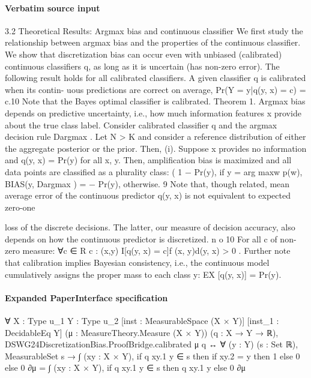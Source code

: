 \documentclass[10pt]{article}
\begin{document}
\paragraph{Verbatim source input}
\begin{ReviewVerbatim}
3.2     Theoretical Results: Argmax bias and continuous classifier
We first study the relationship between argmax bias and the properties of the continuous classifier. We show
that discretization bias can occur even with unbiased (calibrated) continuous classifiers q, as long as it is
uncertain (has non-zero error).
    The following result holds for all calibrated classifiers. A given classifier q is calibrated when its contin-
uous predictions are correct on average, Pr(Y = y|q(y, x) = c) = c.10 Note that the Bayes optimal classifier
is calibrated.
Theorem 1. Argmax bias depends on predictive uncertainty, i.e., how much information features x provide
about the true class label. Consider calibrated classifier q and the argmax decision rule Dargmax . Let N > K
and consider a reference distribution of either the aggregate posterior or the prior. Then,
  (i). Suppose x provides no information and q(y, x) = Pr(y) for all x, y. Then, amplification bias is
       maximized and all data points are classified as a plurality class:
                                                  (
                                                    1 − Pr(y), if y = arg maxw p(w),
                            BIAS(y, Dargmax ) =
                                                    − Pr(y),      otherwise.
   9 Note that, though related, mean average error of the continuous predictor q(y, x) is not equivalent to expected zero-one

loss of the discrete decisions. The latter, our measure of decision accuracy, also depends on how the continuous predictor is
discretized.                                n                                           o
  10 For all c of non-zero measure: ∀c ∈
                                                 R
                                             c : (x,y) I[q(y, x) = c]f (x, y)d(y, x) > 0 . Further note that calibration implies
Bayesian consistency, i.e., the continuous model cumulatively assigns the proper mass to each class y: EX [q(y, x)] = Pr(y).
\end{ReviewVerbatim}


\paragraph{Expanded PaperInterface specification}
\begin{ReviewVerbatim}
∀ {X : Type u_1} {Y : Type u_2} [inst : MeasurableSpace (X × Y)] [inst_1 : DecidableEq Y]
  (μ : MeasureTheory.Measure (X × Y)) (q : X → Y → ℝ),
  DSWG24DiscretizationBias.ProofBridge.calibrated μ q ↔
    ∀ (y : Y) (s : Set ℝ),
      MeasurableSet s →
        ∫ (xy : X × Y), if q xy.1 y ∈ s then if xy.2 = y then 1 else 0 else 0 ∂μ =
          ∫ (xy : X × Y), if q xy.1 y ∈ s then q xy.1 y else 0 ∂μ
\end{ReviewVerbatim}
\end{document}
